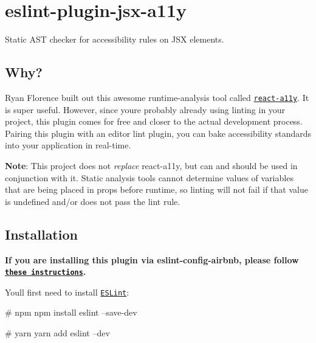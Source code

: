 \href{https://travis-ci.org/evcohen/eslint-plugin-jsx-a11y}{\tt } \href{https://npmjs.org/package/eslint-plugin-jsx-a11y}{\tt } \href{https://github.com/evcohen/eslint-plugin-jsx-a11y/blob/master/LICENSE.md}{\tt } \href{https://coveralls.io/github/evcohen/eslint-plugin-jsx-a11y?branch=master}{\tt } \href{https://npmjs.org/package/eslint-plugin-jsx-a11y}{\tt } 

\section*{eslint-\/plugin-\/jsx-\/a11y}

Static A\+ST checker for accessibility rules on J\+SX elements.

\subsection*{Why?}

Ryan Florence built out this awesome runtime-\/analysis tool called \href{https://github.com/reactjs/react-a11y}{\tt react-\/a11y}. It is super useful. However, since you\textquotesingle{}re probably already using linting in your project, this plugin comes for free and closer to the actual development process. Pairing this plugin with an editor lint plugin, you can bake accessibility standards into your application in real-\/time.

{\bfseries Note}\+: This project does not {\itshape replace} react-\/a11y, but can and should be used in conjunction with it. Static analysis tools cannot determine values of variables that are being placed in props before runtime, so linting will not fail if that value is undefined and/or does not pass the lint rule.

\subsection*{Installation}

{\bfseries If you are installing this plugin via {\ttfamily eslint-\/config-\/airbnb}, please follow \href{https://github.com/airbnb/javascript/tree/master/packages/eslint-config-airbnb#eslint-config-airbnb-1}{\tt these instructions}.}

You\textquotesingle{}ll first need to install \href{http://eslint.org}{\tt E\+S\+Lint}\+:


\begin{DoxyCode}
# npm
npm install eslint --save-dev

# yarn
yarn add eslint --dev
\end{DoxyCode}


